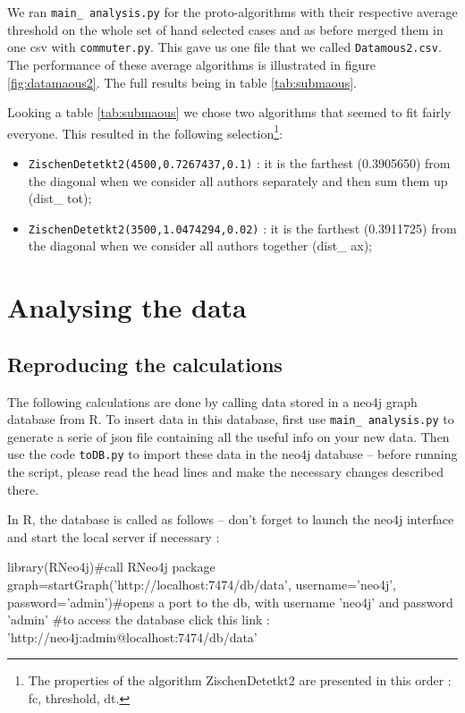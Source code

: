 \documentclass{article}\usepackage[]{graphicx}\usepackage[]{color}
\begin{document}
We ran {\tt main\_ analysis.py} for the proto-algorithms with their respective average threshold on the whole set of hand selected cases and as before merged them in one csv with {\tt commuter.py}. This gave us one file that we called {\tt Datamous2.csv}. The performance of these average algorithms is illustrated in figure \ref{fig:datamaous2}. The full results being in table \ref{tab:submaous}.



Looking a table \ref{tab:submaous} we chose two algorithms that seemed to fit fairly everyone. This resulted in the following selection\footnote{The properties of the algorithm ZischenDetetkt2 are presented in this order : fc, threshold, dt.}:
\begin{itemize}
\item \lstinline[style=mypython]{ZischenDetetkt2(4500,0.7267437,0.1)} : it is the farthest (0.3905650) from the diagonal when we consider all authors separately and then sum them up (dist\_ tot);
\item \lstinline[style=mypython]{ZischenDetetkt2(3500,1.0474294,0.02)} : it is the farthest (0.3911725) from the diagonal when we consider all authors together (dist\_ ax);
\end{itemize}
\section{Analysing the data}

\subsection{Reproducing the calculations}
The following calculations are done by calling data stored in a neo4j graph database from R. To insert data in this database, first use {\tt main\_ analysis.py} to generate a serie of json file containing all the useful info on your new data. Then use the code {\tt toDB.py} to import these data in the neo4j database -- before running the script, please read the head lines and make the necessary changes described there.

In R, the database is called as follows -- don't forget to launch the neo4j interface and start the local server if necessary :

\begin{Schunk}
\begin{Sinput}
library(RNeo4j)#call RNeo4j package
graph=startGraph('http://localhost:7474/db/data', username='neo4j', password='admin')#opens a port to the db, with username 'neo4j' and password 'admin'
#to access the database click this link : 'http://neo4j:admin@localhost:7474/db/data'
\end{Sinput}
\end{Schunk}
\end{document}
